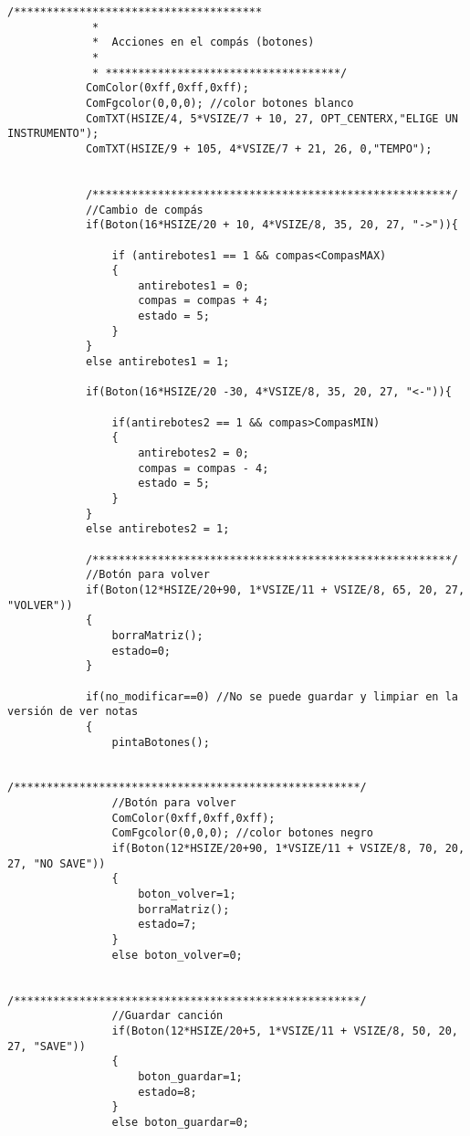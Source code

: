 \documentclass[12pt,a4paper]{article}
\begin{document}
\begin{lstlisting}[basicstyle=\footnotesize] 
            /**************************************
             *
             *  Acciones en el compás (botones)
             *
             * ************************************/
            ComColor(0xff,0xff,0xff);
            ComFgcolor(0,0,0); //color botones blanco
            ComTXT(HSIZE/4, 5*VSIZE/7 + 10, 27, OPT_CENTERX,"ELIGE UN INSTRUMENTO");
            ComTXT(HSIZE/9 + 105, 4*VSIZE/7 + 21, 26, 0,"TEMPO");


            /*******************************************************/
            //Cambio de compás
            if(Boton(16*HSIZE/20 + 10, 4*VSIZE/8, 35, 20, 27, "->")){

                if (antirebotes1 == 1 && compas<CompasMAX)
                {
                    antirebotes1 = 0;
                    compas = compas + 4;
                    estado = 5;
                }
            }
            else antirebotes1 = 1;

            if(Boton(16*HSIZE/20 -30, 4*VSIZE/8, 35, 20, 27, "<-")){

                if(antirebotes2 == 1 && compas>CompasMIN)
                {
                    antirebotes2 = 0;
                    compas = compas - 4;
                    estado = 5;
                }
            }
            else antirebotes2 = 1;

            /*******************************************************/
            //Botón para volver
            if(Boton(12*HSIZE/20+90, 1*VSIZE/11 + VSIZE/8, 65, 20, 27, "VOLVER"))
            {
                borraMatriz();
                estado=0;
            }

            if(no_modificar==0) //No se puede guardar y limpiar en la versión de ver notas
            {
                pintaBotones();

                /*****************************************************/
                //Botón para volver
                ComColor(0xff,0xff,0xff);
                ComFgcolor(0,0,0); //color botones negro
                if(Boton(12*HSIZE/20+90, 1*VSIZE/11 + VSIZE/8, 70, 20, 27, "NO SAVE"))
                {
                    boton_volver=1;
                    borraMatriz();
                    estado=7;
                }
                else boton_volver=0;

                /*****************************************************/
                //Guardar canción
                if(Boton(12*HSIZE/20+5, 1*VSIZE/11 + VSIZE/8, 50, 20, 27, "SAVE"))
                {
                    boton_guardar=1;
                    estado=8;
                }
                else boton_guardar=0;




\end{lstlisting}
\end{document}
